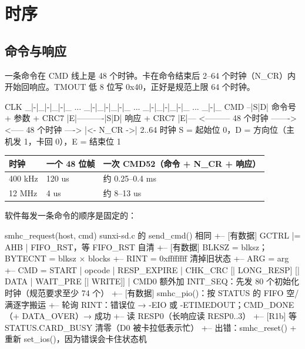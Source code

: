 \section{时序}

\subsection{命令与响应}

一条命令在 CMD 线上是 48 个时钟。卡在命令结束后 2–64 个时钟（N\_CR）内开始回响应。TMOUT 低 8 位写 0x40，正好是规范上限 64 个时钟。

\begin{txtcode}
CLK     _|-|_|-|_|-|_ ... _|-|_|-|_|-|_ ... _|-|_|-|_|-|_ ... _|-|_
CMD     --|S|D| 命令号 + 参数 + CRC7 |E|----------|S|D| 响应 + CRC7 |E|---
           <--------- 48 个时钟 ------->          <----- 48 个时钟 ---->
                                       |<- N_CR ->|
                                         2..64 时钟
S = 起始位 0，D = 方向位（主机发 1，卡回 0），E = 结束位 1
\end{txtcode}

\begin{table}[H]
\centering
\small
\begin{tabularx}{\linewidth}{ll>{\raggedright\arraybackslash}X}
\toprule
时钟 & 一个 48 位帧 & 一次 CMD52（命令 + N\_CR + 响应） \\
\midrule
400 kHz & 120 us & 约 0.25–0.4 ms \\
12 MHz & 4 us & 约 8–13 us \\
\bottomrule
\end{tabularx}
\end{table}

软件每发一条命令的顺序是固定的：

\begin{txtcode}
smhc_request(host, cmd)                      sunxi-sd.c 的 send_cmd() 相同
+-- [有数据] GCTRL |= AHB | FIFO_RST，等 FIFO_RST 自清
+-- [有数据] BLKSZ = blksz；BYTECNT = blksz × blocks
+-- RINT = 0xffffffff                        清掉旧状态
+-- ARG = arg
+-- CMD = START | opcode | RESP_EXPIRE | CHK_CRC [| LONG_RESP] [| DATA | WAIT_PRE [| WRITE]]
|         CMD0 额外加 INIT_SEQ：先发 80 个初始化时钟（规范要求至少 74 个）
+-- [有数据] smhc_pio()：按 STATUS 的 FIFO 空/满逐字搬运
+-- 轮询 RINT：错误位 → -EIO 或 -ETIMEDOUT；CMD_DONE（+ DATA_OVER）→ 成功
+-- 读 RESP0（长响应读 RESP0..3）
+-- [R1b] 等 STATUS.CARD_BUSY 清零（D0 被卡拉低表示忙）
+-- 出错：smhc_reset() + 重新 set_ios()，因为错误会卡住状态机
\end{txtcode}

